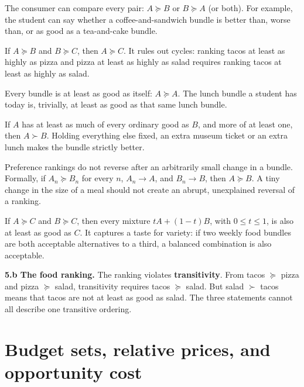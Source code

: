 \documentclass[11pt,a4paper]{article}
\begin{document}
\begin{description}[style=nextline,font=\sffamily\bfseries,leftmargin=2.65cm]
  \item[Completeness]
  The consumer can compare every pair: \(A\succeq B\) or \(B\succeq A\)
  (or both). For example, the student can say whether a coffee-and-sandwich
  bundle is better than, worse than, or as good as a tea-and-cake bundle.

  \item[Transitivity]
  If \(A\succeq B\) and \(B\succeq C\), then \(A\succeq C\). It rules out
  cycles: ranking tacos at least as highly as pizza and pizza at least as
  highly as salad requires ranking tacos at least as highly as salad.

  \item[Reflexivity]
  Every bundle is at least as good as itself: \(A\succeq A\). The lunch
  bundle a student has today is, trivially, at least as good as that same
  lunch bundle.

  \item[Monotonicity]
  If \(A\) has at least as much of every ordinary good as \(B\), and more of
  at least one, then \(A\succ B\). Holding everything else fixed, an extra
  museum ticket or an extra lunch makes the bundle strictly better.

  \item[Continuity]
  Preference rankings do not reverse after an arbitrarily small change in a
  bundle. Formally, if \(A_n\succeq B_n\) for every \(n\), \(A_n\to A\), and
  \(B_n\to B\), then \(A\succeq B\). A tiny change in the size of a meal
  should not create an abrupt, unexplained reversal of a ranking.

  \item[Convexity]
  If \(A\succeq C\) and \(B\succeq C\), then every mixture
  \(tA+(1-t)B\), with \(0\leq t\leq1\), is also at least as good as \(C\).
  It captures a taste for variety: if two weekly food bundles are both
  acceptable alternatives to a third, a balanced combination is also
  acceptable.
\end{description}

\textbf{5.b The food ranking.} The ranking violates \textbf{transitivity}.
From tacos \(\succeq\) pizza and pizza \(\succeq\) salad, transitivity
requires tacos \(\succeq\) salad. But salad \(\succ\) tacos means that tacos
are not at least as good as salad. The three statements cannot all describe
one transitive ordering.

\section{Budget sets, relative prices, and opportunity cost}
\end{document}
